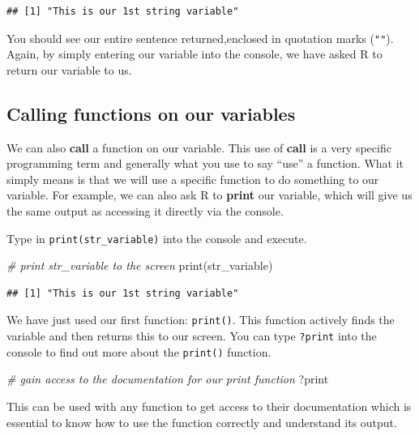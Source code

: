 \documentclass[
]{book}
\newenvironment{Shaded}{\begin{snugshade}}{\end{snugshade}}
\newcommand{\CommentTok}[1]{\textcolor[rgb]{0.56,0.35,0.01}{\textit{#1}}}
\newcommand{\FunctionTok}[1]{\textcolor[rgb]{0.00,0.00,0.00}{#1}}
\newcommand{\NormalTok}[1]{#1}
\begin{document}
\begin{verbatim}
## [1] "This is our 1st string variable"
\end{verbatim}

You should see our entire sentence returned,enclosed in quotation marks (\texttt{""}). Again, by simply entering our variable into the console, we have asked R to return our variable to us.

\hypertarget{calling-functions-on-our-variables}{%
\subsection{Calling functions on our variables}\label{calling-functions-on-our-variables}}

We can also \textbf{call} a function on our variable. This use of \textbf{call} is a very specific programming term and generally what you use to say ``use'' a function. What it simply means is that we will use a specific function to do something to our variable. For example, we can also ask R to \textbf{print} our variable, which will give us the same output as accessing it directly via the console.

Type in \texttt{print(str\_variable)} into the console and execute.

\begin{Shaded}
\begin{Highlighting}[]
\CommentTok{\# print str\_variable to the screen}
\FunctionTok{print}\NormalTok{(str\_variable)}
\end{Highlighting}
\end{Shaded}

\begin{verbatim}
## [1] "This is our 1st string variable"
\end{verbatim}

We have just used our first function: \texttt{print()}. This function actively finds the variable and then returns this to our screen. You can type \texttt{?print} into the console to find out more about the \texttt{print()} function.

\begin{Shaded}
\begin{Highlighting}[]
\CommentTok{\# gain access to the documentation for our print function}
\NormalTok{?print}
\end{Highlighting}
\end{Shaded}

This can be used with any function to get access to their documentation which is essential to know how to use the function correctly and understand its output.
\end{document}
